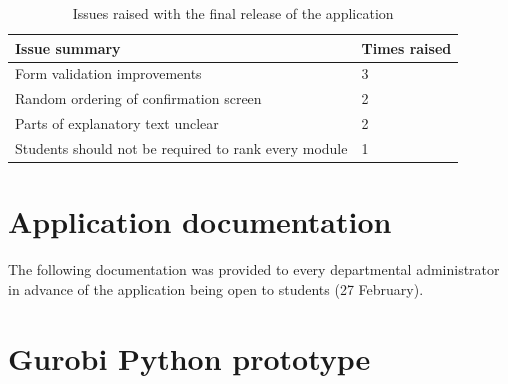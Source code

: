 \documentclass[draft]{scrartcl}
\let\stdsection\section
\renewcommand\section{\clearpage\stdsection}
\begin{document}
\begin{table}[h]
  \begin{center}
    \begin{tabular}{ | l | l | }
      \hline
      \textbf{Issue summary}                & \textbf{Times raised}  \\
      \hline
      Form validation improvements                         &    3    \\
      Random ordering of confirmation screen               &    2    \\
      Parts of explanatory text unclear                    &    2    \\
      Students should not be required to rank every module &    1    \\
      \hline
    \end{tabular}
  \end{center}
  \caption{Issues raised with the final release of the application}
  \label{table:finalissues}
\end{table}

\stdsection{Application documentation}
\label{sec:documentation}

The following documentation was provided to every departmental administrator
in advance of the application being open to students (27 February).




\stdsection{Gurobi Python prototype}
\label{sec:gurobipythonprototype}

\lstset{language=Python}



\clearpage
\printglossaries

\clearpage

\end{document}
